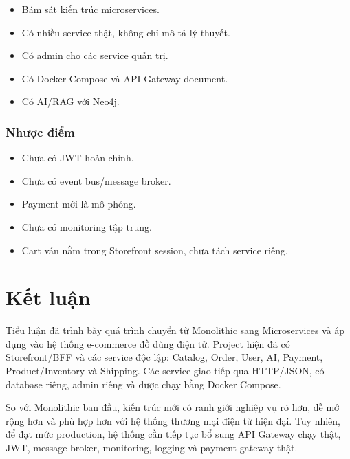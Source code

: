 \documentclass[12pt,a4paper]{report}
\begin{document}
\begin{itemize}
  \item Bám sát kiến trúc microservices.
  \item Có nhiều service thật, không chỉ mô tả lý thuyết.
  \item Có admin cho các service quản trị.
  \item Có Docker Compose và API Gateway document.
  \item Có AI/RAG với Neo4j.
\end{itemize}

\subsection{Nhược điểm}

\begin{itemize}
  \item Chưa có JWT hoàn chỉnh.
  \item Chưa có event bus/message broker.
  \item Payment mới là mô phỏng.
  \item Chưa có monitoring tập trung.
  \item Cart vẫn nằm trong Storefront session, chưa tách service riêng.
\end{itemize}

\chapter*{Kết luận}

Tiểu luận đã trình bày quá trình chuyển từ Monolithic sang Microservices và áp dụng vào hệ thống e-commerce đồ dùng điện tử. Project hiện đã có Storefront/BFF và các service độc lập: Catalog, Order, User, AI, Payment, Product/Inventory và Shipping. Các service giao tiếp qua HTTP/JSON, có database riêng, admin riêng và được chạy bằng Docker Compose.

So với Monolithic ban đầu, kiến trúc mới có ranh giới nghiệp vụ rõ hơn, dễ mở rộng hơn và phù hợp hơn với hệ thống thương mại điện tử hiện đại. Tuy nhiên, để đạt mức production, hệ thống cần tiếp tục bổ sung API Gateway chạy thật, JWT, message broker, monitoring, logging và payment gateway thật.
\end{document}
